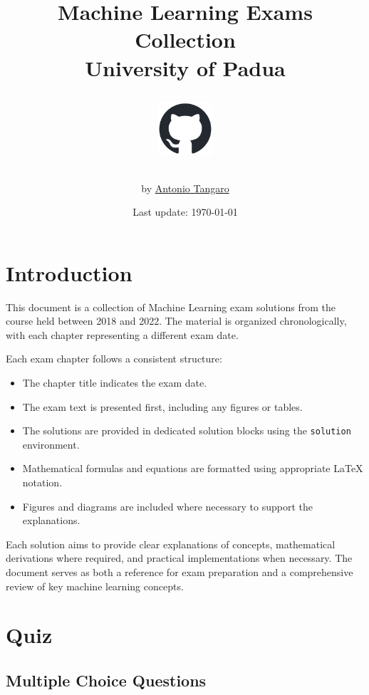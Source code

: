 \documentclass[a4paper,11pt,oneside]{book}
\title{Machine Learning Exams Collection\\
University of Padua\\[1em]
\author{by \href{https://github.com/antoniooodev}{Antonio Tangaro}}
\date{Last update: \today}
\href{https://github.com/antoniooodev}{\includegraphics[width=2cm]{images/github-mark.png}}}
\begin{document}
\maketitle
\tableofcontents

\chapter*{Introduction}
    This document is a collection of Machine Learning exam solutions from the course held between 2018 and 2022. The material is organized chronologically, with each chapter representing a different exam date.

    Each exam chapter follows a consistent structure:
    \begin{itemize}
        \item The chapter title indicates the exam date.
        \item The exam text is presented first, including any figures or tables.
        \item The solutions are provided in dedicated solution blocks using the \texttt{solution} environment.
        \item Mathematical formulas and equations are formatted using appropriate LaTeX notation.
        \item Figures and diagrams are included where necessary to support the explanations.
    \end{itemize}

    Each solution aims to provide clear explanations of concepts, mathematical derivations where required, and practical implementations when necessary. The document serves as both a reference for exam preparation and a comprehensive review of key machine learning concepts.


\chapter{Quiz}

\section{Multiple Choice Questions}
\end{document}

